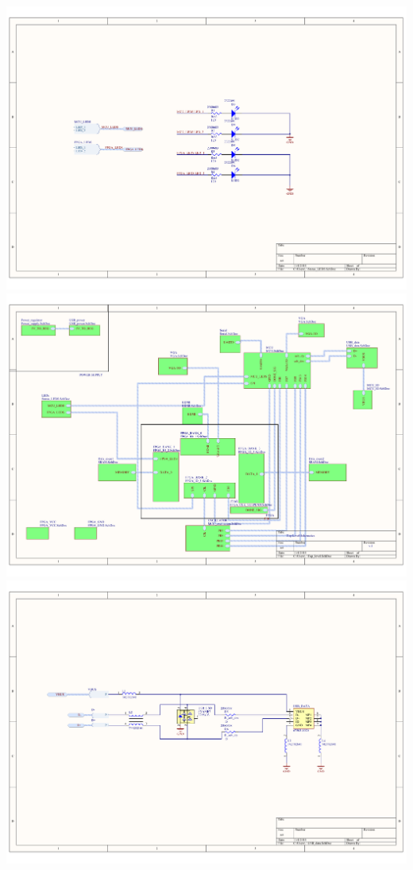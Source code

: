 \documentclass[../main/report.tex]{subfiles}
\begin{document}
\newpage
\includegraphics[width=\paperwidth]{../appendix/PCB_schematics/Status_LEDS.PDF}
\newpage
\includegraphics[width=\paperwidth]{../appendix/PCB_schematics/Top_level.PDF}
\newpage
\includegraphics[width=\paperwidth]{../appendix/PCB_schematics/USB_data.PDF}
\end{document}
